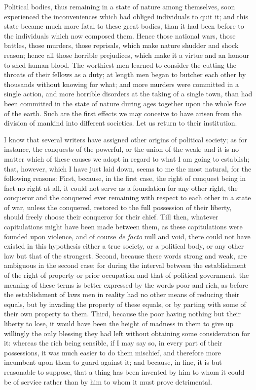 \documentclass[11pt,twocolumn]{ltugboat}
\begin{document}
Political bodies, thus remaining in a state of nature among
themselves, soon experienced the inconveniences which had obliged
individuals to quit it; and this state became much more fatal to these
great bodies, than it had been before to the individuals which now
composed them. Hence those national wars, those battles, those
murders, those reprisals, which make nature shudder and shock reason;
hence all those horrible prejudices, which make it a virtue and an
honour to shed human blood. The worthiest men learned to consider the
cutting the throats of their fellows as a duty; at length men began to
butcher each other by thousands without knowing for what; and more
murders were committed in a single action, and more horrible disorders
at the taking of a single town, than had been committed in the state
of nature during ages together upon the whole face of the earth. Such
are the first effects we may conceive to have arisen from the division
of mankind into different societies. Let us return to their
institution.

I know that several writers have assigned other origins of political
society; as for instance, the conquests of the powerful, or the union
of the weak; and it is no matter which of these causes we adopt in
regard to what I am going to establish; that, however, which I have
just laid down, seems to me the most natural, for the following
reasons: First, because, in the first case, the right of conquest
being in fact no right at all, it could not serve as a foundation for
any other right, the conqueror and the conquered ever remaining with
respect to each other in a state of war, unless the conquered,
restored to the full possession of their liberty, should freely choose
their conqueror for their chief. Till then, whatever capitulations
might have been made between them, as these capitulations were founded
upon violence, and of course \textit{de facto} null and void, there could not
have existed in this hypothesis either a true society, or a political
body, or any other law but that of the strongest. Second, because
these words strong and weak, are ambiguous in the second case; for
during the interval between the establishment of the right of property
or prior occupation and that of political government, the meaning of
these terms is better expressed by the words poor and rich, as before
the establishment of laws men in reality had no other means of
reducing their equals, but by invading the property of these equals,
or by parting with some of their own property to them. Third, because
the poor having nothing but their liberty to lose, it would have been
the height of madness in them to give up willingly the only blessing
they had left without obtaining some consideration for it: whereas the
rich being sensible, if I may say so, in every part of their
possessions, it was much easier to do them mischief, and therefore
more incumbent upon them to guard against it; and because, in fine, it
is but reasonable to suppose, that a thing has been invented by him to
whom it could be of service rather than by him to whom it must prove
detrimental.
\end{document}
